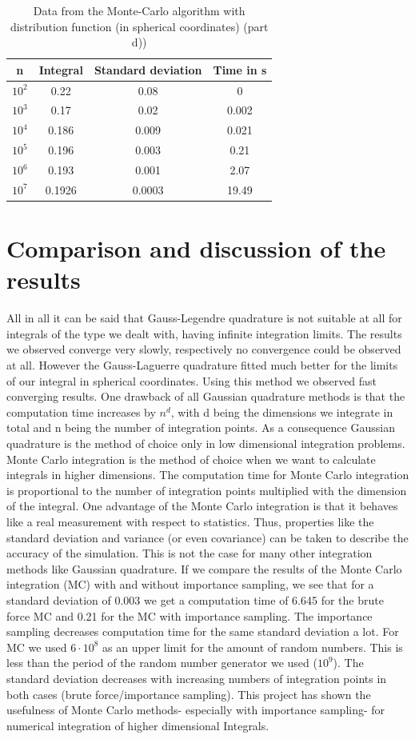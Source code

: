 \documentclass[10pt,a4paper]{article}
\begin{document}
\begin{table}[h]
\centering
\caption{Data from the Monte-Carlo algorithm with distribution function (in spherical coordinates) (part d))}
\label{Data from the  montecarlo algorithm (part d))}
\begin{tabular}{c|c|c|c}
n & Integral & Standard deviation & Time in s \\
\hline\hline
$10^2$ & 0.22 & 0.08 & 0 \\
$10^3$ & 0.17 & 0.02 & 0.002 \\
$10^4$ & 0.186 & 0.009 & 0.021 \\
$10^5$ & 0.196 & 0.003 & 0.21 \\
$10^6$ & 0.193 & 0.001 & 2.07 \\
$10^7$ & 0.1926 & 0.0003 &  19.49
\end{tabular}
\end{table}

\section{Comparison and discussion of the results}

All in all it can be said that Gauss-Legendre quadrature is not suitable at all for integrals of the type we dealt with, having infinite integration limits. The results we observed converge very slowly, respectively no convergence could be observed at all. However the Gauss-Laguerre quadrature fitted much better for the limits of our integral in spherical coordinates. Using this method we observed fast converging results. One drawback of all Gaussian quadrature methods is that the computation time increases by $n^d$, with d being the dimensions we integrate in total and n being the number of integration points. As a consequence Gaussian quadrature is the method of choice only in low dimensional integration problems.
Monte Carlo integration is the method of choice when we want to calculate integrals in higher dimensions. The computation time for Monte Carlo integration is proportional to the number of integration points multiplied with the dimension of the integral. One advantage of the Monte Carlo integration is that it behaves like a real measurement with respect to statistics. Thus, properties like the standard deviation and variance (or even covariance) can be taken to describe the accuracy of the simulation. This is not the case for many other integration methods like Gaussian quadrature. If we compare the results of the Monte Carlo integration (MC) with and without importance sampling, we see that for a standard deviation of 0.003 we get a computation time of 6.645 for the brute force MC and 0.21 for the MC with importance sampling. The importance sampling decreases computation time for the same standard deviation a lot. For MC we used $6 \cdot 10^{8}$ as an upper limit for the amount of random numbers. This is less than the period of the random number generator we used ($10^{9}$). The standard deviation decreases with increasing numbers of integration points in both cases (brute force/importance sampling). This project has shown the usefulness of Monte Carlo methods- especially with importance sampling- for numerical integration of higher dimensional Integrals. 
\end{document}
